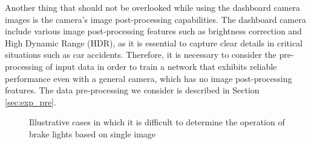 Another thing that should not be overlooked while using the dashboard camera images is the camera's image post-processing capabilities.
The dashboard camera include various image post-processing features such as brightness correction and High Dynamic Range (HDR), as it is essential to capture clear details in critical situations such as car accidents.
Therefore, it is necessary to consider the pre-processing of input data in order to train a network that exhibits reliable performance even with a general camera, which has no image post-processing features. The data pre-processing we consider is described in Section \ref{sec:exp_pre}.

\begin{figure}[t]%

    \hfill

\caption{Illustrative cases in which it is difficult to determine the operation of brake lights based on single image} 
\label{fig:label_hard}%
\end{figure}

